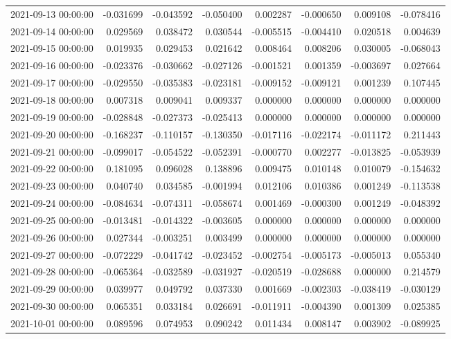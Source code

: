 \begin{tabular}{lrrrrrrr}
2021-09-13 00:00:00 & -0.031699 & -0.043592 & -0.050400 & 0.002287 & -0.000650 & 0.009108 & -0.078416 \\
2021-09-14 00:00:00 & 0.029569 & 0.038472 & 0.030544 & -0.005515 & -0.004410 & 0.020518 & 0.004639 \\
2021-09-15 00:00:00 & 0.019935 & 0.029453 & 0.021642 & 0.008464 & 0.008206 & 0.030005 & -0.068043 \\
2021-09-16 00:00:00 & -0.023376 & -0.030662 & -0.027126 & -0.001521 & 0.001359 & -0.003697 & 0.027664 \\
2021-09-17 00:00:00 & -0.029550 & -0.035383 & -0.023181 & -0.009152 & -0.009121 & 0.001239 & 0.107445 \\
2021-09-18 00:00:00 & 0.007318 & 0.009041 & 0.009337 & 0.000000 & 0.000000 & 0.000000 & 0.000000 \\
2021-09-19 00:00:00 & -0.028848 & -0.027373 & -0.025413 & 0.000000 & 0.000000 & 0.000000 & 0.000000 \\
2021-09-20 00:00:00 & -0.168237 & -0.110157 & -0.130350 & -0.017116 & -0.022174 & -0.011172 & 0.211443 \\
2021-09-21 00:00:00 & -0.099017 & -0.054522 & -0.052391 & -0.000770 & 0.002277 & -0.013825 & -0.053939 \\
2021-09-22 00:00:00 & 0.181095 & 0.096028 & 0.138896 & 0.009475 & 0.010148 & 0.010079 & -0.154632 \\
2021-09-23 00:00:00 & 0.040740 & 0.034585 & -0.001994 & 0.012106 & 0.010386 & 0.001249 & -0.113538 \\
2021-09-24 00:00:00 & -0.084634 & -0.074311 & -0.058674 & 0.001469 & -0.000300 & 0.001249 & -0.048392 \\
2021-09-25 00:00:00 & -0.013481 & -0.014322 & -0.003605 & 0.000000 & 0.000000 & 0.000000 & 0.000000 \\
2021-09-26 00:00:00 & 0.027344 & -0.003251 & 0.003499 & 0.000000 & 0.000000 & 0.000000 & 0.000000 \\
2021-09-27 00:00:00 & -0.072229 & -0.041742 & -0.023452 & -0.002754 & -0.005173 & -0.005013 & 0.055340 \\
2021-09-28 00:00:00 & -0.065364 & -0.032589 & -0.031927 & -0.020519 & -0.028688 & 0.000000 & 0.214579 \\
2021-09-29 00:00:00 & 0.039977 & 0.049792 & 0.037330 & 0.001669 & -0.002303 & -0.038419 & -0.030129 \\
2021-09-30 00:00:00 & 0.065351 & 0.033184 & 0.026691 & -0.011911 & -0.004390 & 0.001309 & 0.025385 \\
2021-10-01 00:00:00 & 0.089596 & 0.074953 & 0.090242 & 0.011434 & 0.008147 & 0.003902 & -0.089925 \\

\end{tabular}
